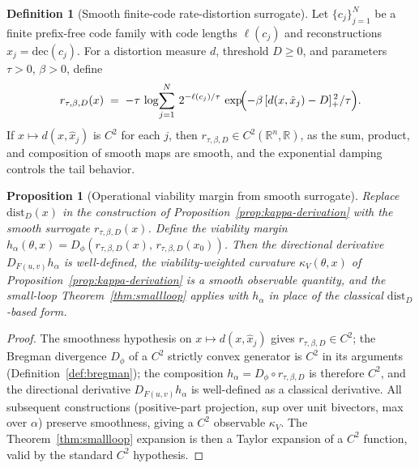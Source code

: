 \documentclass[11pt,a4paper]{article}
\theoremstyle{plain}
\newtheorem{proposition}[theorem]{Proposition}
\theoremstyle{definition}
\newtheorem{definition}[theorem]{Definition}
\theoremstyle{remark}
\newcommand{\kk}{\kappa_{\!V}}
\newcommand{\RR}{\mathbb{R}}
\newcommand{\distD}{\mathrm{dist}_{D}}
\begin{document}
\begin{definition}[Smooth finite-code rate-distortion surrogate]
\label{def:ard-surrogate}
Let $\{c_j\}_{j=1}^N$ be a finite prefix-free code family with code
lengths $\ell(c_j)$ and reconstructions $\hat x_j = \mathrm{dec}(c_j)$.
For a distortion measure $d$, threshold $D\geq 0$, and parameters
$\tau > 0$, $\beta > 0$, define
\begin{equation}\label{eq:ard-surrogate}
  r_{\tau,\beta,D}(x) \;=\; -\tau\,\log\!\sum_{j=1}^{N}\,2^{-\ell(c_j)/\tau}\,
  \exp\!\Bigl(-\beta\,[d(x, \hat x_j) - D]_+^{\,2}/\tau\Bigr).
\end{equation}
If $x \mapsto d(x, \hat x_j)$ is $C^2$ for each $j$, then
$r_{\tau,\beta,D} \in C^2(\RR^n, \RR)$, as the sum, product, and
composition of smooth maps are smooth, and the exponential damping
controls the tail behavior.
\end{definition}

\begin{proposition}[Operational viability margin from smooth surrogate]
\label{prop:ard-surrogate}
Replace $\distD(x)$ in the construction of
Proposition~\ref{prop:kappa-derivation} with the smooth surrogate
$r_{\tau,\beta,D}(x)$. Define the viability margin
$h_\alpha(\theta, x) = D_\phi(r_{\tau,\beta,D}(x),\,
r_{\tau,\beta,D}(x_0))$. Then the directional derivative
$D_{F(u,v)} h_\alpha$ is well-defined, the viability-weighted
curvature $\kk(\theta, x)$ of Proposition~\ref{prop:kappa-derivation}
is a smooth observable quantity, and the small-loop
Theorem~\ref{thm:smallloop} applies with $h_\alpha$ in place of the
classical $\distD$-based form.
\end{proposition}

\begin{proof}
The smoothness hypothesis on $x \mapsto d(x, \hat x_j)$ gives
$r_{\tau, \beta, D} \in C^2$; the Bregman divergence
$D_\phi$ of a $C^2$ strictly convex generator is $C^2$ in its
arguments (Definition~\ref{def:bregman}); the composition
$h_\alpha = D_\phi \circ r_{\tau,\beta,D}$ is therefore $C^2$, and the
directional derivative $D_{F(u,v)} h_\alpha$ is well-defined as a
classical derivative. All subsequent constructions (positive-part
projection, sup over unit bivectors, max over $\alpha$) preserve
smoothness, giving a $C^2$ observable $\kk$. The
Theorem~\ref{thm:smallloop} expansion is then a Taylor expansion of a
$C^2$ function, valid by the standard $C^2$ hypothesis.
\end{proof}
\end{document}

